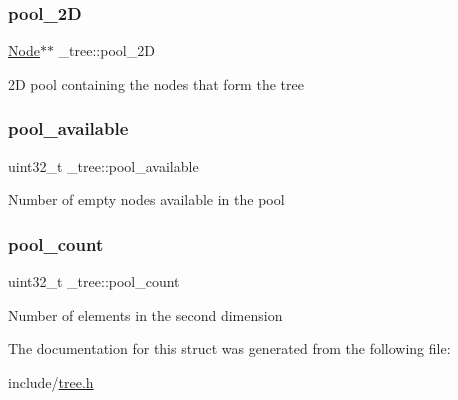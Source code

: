 \subsubsection{\texorpdfstring{pool\+\_\+2D}{pool\_2D}}
{\footnotesize\ttfamily \mbox{\hyperlink{tree_8h_a6390a1d02010dee1843fa2b1263308c1}{Node}}$\ast$$\ast$ \+\_\+tree\+::pool\+\_\+2D}

2D pool containing the nodes that form the tree \mbox{\label{struct__tree_afd3769cd9db40fa460d35a0033fb7d02}} 
\subsubsection{\texorpdfstring{pool\+\_\+available}{pool\_available}}
{\footnotesize\ttfamily uint32\+\_\+t \+\_\+tree\+::pool\+\_\+available}

Number of empty nodes available in the pool \mbox{\label{struct__tree_aa90c2b558fc833fc22bcd6617689a41f}} 
\subsubsection{\texorpdfstring{pool\+\_\+count}{pool\_count}}
{\footnotesize\ttfamily uint32\+\_\+t \+\_\+tree\+::pool\+\_\+count}

Number of elements in the second dimension 

The documentation for this struct was generated from the following file\+:\begin{DoxyCompactItemize}
\item 
include/\mbox{\hyperlink{tree_8h}{tree.\+h}}\end{DoxyCompactItemize}
